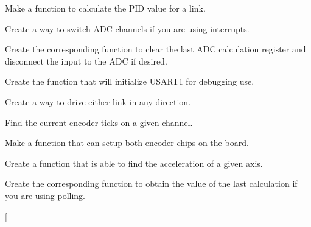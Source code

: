 
\begin{DoxyRefList}
\item[\label{todo__todo000018}%
\hypertarget{todo__todo000018}{}%
Global \hyperlink{_p_i_d_8h_a0b728f39f71526d44fd7cff0ce67319e}{calc\-P\-I\-D} (char link, int set\-Point, int act\-Pos)]Make a function to calculate the P\-I\-D value for a link.  
\item[\label{todo__todo000004}%
\hypertarget{todo__todo000004}{}%
Global \hyperlink{_a_d_c_8c_a8174ca24b578eaf4f82f44d6ce44edb0}{change\-A\-D\-C} (int channel)]Create a way to switch A\-D\-C channels if you are using interrupts.  
\item[\label{todo__todo000002}%
\hypertarget{todo__todo000002}{}%
Global \hyperlink{_a_d_c_8c_a3eef680fc13f11498db80fb145cab8f9}{clear\-A\-D\-C} (int channel)]Create the corresponding function to clear the last A\-D\-C calculation register and disconnect the input to the A\-D\-C if desired.  
\item[\label{todo__todo000029}%
\hypertarget{todo__todo000029}{}%
Global \hyperlink{_u_s_a_r_t_debug_8c_a9a96eb5e6b5a13fff8ed69716e76a314}{debug\-U\-S\-A\-R\-T\-Init} (unsigned long baudrate)]Create the function that will initialize U\-S\-A\-R\-T1 for debugging use.  
\item[\label{todo__todo000009}%
\hypertarget{todo__todo000009}{}%
Global \hyperlink{motors_8h_af4a8cb121ce437984322ade3672082d2}{drive\-Link} (int link, int dir)]Create a way to drive either link in any direction.  
\item[\label{todo__todo000015}%
\hypertarget{todo__todo000015}{}%
Global \hyperlink{_periph_8h_a6c804bfcd9e9943d093395f535a3b672}{enc\-Count} (int chan)]Find the current encoder ticks on a given channel.  
\item[\label{todo__todo000013}%
\hypertarget{todo__todo000013}{}%
Global \hyperlink{_periph_8h_a15de8c2dd97f966ce278ab793669adfd}{enc\-Init} (int chan)]Make a function that can setup both encoder chips on the board.  
\item[\label{todo__todo000011}%
\hypertarget{todo__todo000011}{}%
Global \hyperlink{_periph_8h_a664961c139fdb66c6fd0fb0e997df433}{get\-Accel} (int axis)]Create a function that is able to find the acceleration of a given axis.  
\item[\label{todo__todo000003}%
\hypertarget{todo__todo000003}{}%
Global \hyperlink{_a_d_c_8c_a9f560657fb624f98de3161651f3d4385}{get\-A\-D\-C} (int channel)]Create the corresponding function to obtain the value of the last calculation if you are using polling.  
\item[\label{todo__todo000031}%

\end{DoxyRefList}
